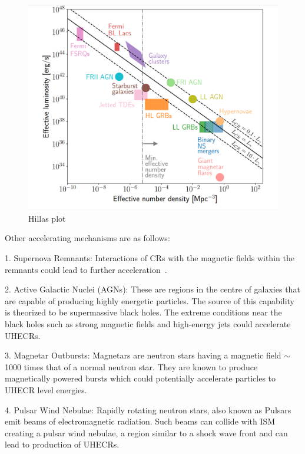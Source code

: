 \begin{figure}[t!]
  \centering
  \includegraphics[width=14.5cm]{thesis_figures/CRnNu/Hillas_modified.png}
  \caption{Hillas plot~\cite{AlvesBatista:2019tlv}}
  \label{fig:Hillas_modified}
\end{figure}


Other accelerating mechanisms are as follows:

1. Supernova Remnants:  Interactions of CRs with the magnetic fields within the remnants could lead to further acceleration~\cite{BLASI_2011}.

2. Active Galactic Nuclei (AGNs): These are regions in the centre of galaxies that are capable of producing highly energetic particles. The source of this capability is theorized to be supermassive black holes. The extreme conditions near the black holes such as strong magnetic fields and high-energy jets could accelerate UHECRs.~\cite{Rieger_2022}

3. Magnetar Outbursts: Magnetars are neutron stars having a magnetic field $\sim$1000 times that of a normal neutron star. They are known to produce magnetically powered bursts which could potentially accelerate particles to UHECR level energies.~\cite{PhysRevD.84.023002}

4. Pulsar Wind Nebulae: Rapidly rotating neutron stars, also known as Pulsars emit beams of electromagnetic radiation. Such beams can collide with ISM creating a pulsar wind nebulae, a region similar to a shock wave front and can lead to production of UHECRs.~\cite{Cerutti_2020}

